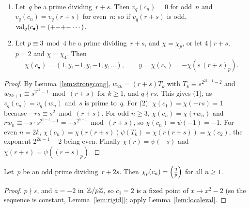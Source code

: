 \begin{lemma}[Primes of~$r + s$]
  \label{lem:pat-rs}
  \leanok
  \begin{enumerate}
    \item Let~$q$ be a prime dividing~$r + s$. Then $v_q(c_n) = 0$ for odd~$n$ and
          $v_q(c_n) = v_q(r + s)$ for even~$n$; so if $v_q(r + s)$ is odd,
          $\operatorname{val}_q(c_\bullet) = ({+}{-}{+}{-}\cdots)$.
    \item Let $p \equiv 3 \bmod 4$ be a prime dividing~$r + s$, and $\chi = \chi_p$, or let
          $4 \mid r + s$, $p = 2$ and $\chi = \chi_4$. Then
          \[ \chi(c_\bullet) = (1, y, -1, y, -1, y, \dots), \qquad
             y = \chi(c_2) = -\chi(s\,(r + s)_p). \]
  \end{enumerate}
\end{lemma}
\begin{proof}
  \leanok
  By Lemma~\ref{lem:strongcong}, $w_{2k} = (r + s) T_k$ with $T_k \equiv s^{2^{2k-1} - 2}$ and
  $w_{2k+1} \equiv s^{2^{2k} - 1} \bmod (r + s)$ for $k \ge 1$, and $q \nmid rs$. This gives (1),
  as $v_q(c_n) = v_q(w_n)$ and~$s$ is prime to~$q$. For (2): $\chi(c_1) = \chi(-rs) = 1$ because
  $-rs \equiv s^2 \bmod (r + s)$. For odd $n \ge 3$, $\chi(c_n) = \chi(r w_n)$ and
  $r w_n \equiv -s \cdot s^{2^{n-1} - 1} = -s^{2^{n-1}} \bmod (r + s)$, so $\chi(c_n) = \psi(-1) =
  -1$. For even $n = 2k$, $\chi(c_n) = \chi(r (r + s))\psi(T_k) = \chi(r(r+s)) = \chi(c_2)$, the
  exponent $2^{2k-1} - 2$ being even. Finally $\chi(r) = \psi(-s)$ and
  $\chi(r + s) = \psi((r + s)_p)$.
\end{proof}

\begin{lemma}[Primes of~$r + 2s$]
  \label{lem:pat-r2s}
  \leanok
  Let~$p$ be an odd prime dividing~$r + 2s$. Then $\chi_p(c_n) = \left(\frac{2}{p}\right)$ for all $n \ge 1$.
\end{lemma}
\begin{proof}
  \leanok
  $p \nmid s$, and $\bar a = -2$ in~$\mathbb{Z}/p\mathbb{Z}$, so $\bar c_1 = 2$ is a fixed point of
  $x \mapsto x^2 - 2$ (so the sequence is constant, Lemma~\ref{lem:rigid}); apply
  Lemma~\ref{lem:localeval}.
\end{proof}

